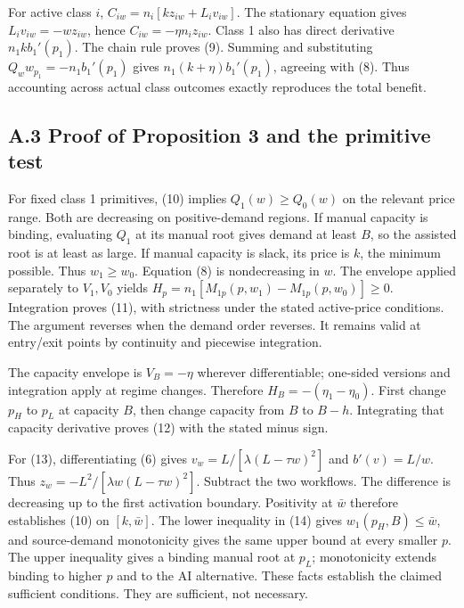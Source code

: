 \documentclass[
  11pt,
  a4paper,
]{article}
\begin{document}
For active class \(i\), \(C_{iw}=n_i[k z_{iw}+L_i v_{iw}]\). The
stationary equation gives \(L_i v_{iw}=-w z_{iw}\), hence
\(C_{iw}=-\eta n_i z_{iw}\). Class 1 also has direct derivative
\(n_1 k b_1'(p_1)\). The chain rule proves (9). Summing and substituting
\(Q_w w_{p_1}=-n_1 b_1'(p_1)\) gives \(n_1(k+\eta)b_1'(p_1)\), agreeing
with (8). Thus accounting across actual class outcomes exactly
reproduces the total benefit.

\hypertarget{a.3-proof-of-proposition-3-and-the-primitive-test}{%
\subsection{A.3 Proof of Proposition 3 and the primitive
test}\label{a.3-proof-of-proposition-3-and-the-primitive-test}}

For fixed class 1 primitives, (10) implies \(Q_1(w)\geq Q_0(w)\) on the
relevant price range. Both are decreasing on positive-demand regions. If
manual capacity is binding, evaluating \(Q_1\) at its manual root gives
demand at least \(B\), so the assisted root is at least as large. If
manual capacity is slack, its price is \(k\), the minimum possible. Thus
\(w_1\geq w_0\). Equation (8) is nondecreasing in \(w\). The envelope
applied separately to \(V_1,V_0\) yields
\(H_p=n_1[M_{1p}(p,w_1)-M_{1p}(p,w_0)]\geq0\). Integration proves (11),
with strictness under the stated active-price conditions. The argument
reverses when the demand order reverses. It remains valid at entry/exit
points by continuity and piecewise integration.

The capacity envelope is \(V_B=-\eta\) wherever differentiable;
one-sided versions and integration apply at regime changes. Therefore
\(H_B=-(\eta_1-\eta_0)\). First change \(p_H\) to \(p_L\) at capacity
\(B\), then change capacity from \(B\) to \(B-h\). Integrating that
capacity derivative proves (12) with the stated minus sign.

For (13), differentiating (6) gives \(v_w=L/[\lambda(L-\tau w)^2]\) and
\(b'(v)=L/w\). Thus \(z_w=-L^2/[\lambda w(L-\tau w)^2]\). Subtract the
two workflows. The difference is decreasing up to the first activation
boundary. Positivity at \(\bar w\) therefore establishes (10) on
\([k,\bar w]\). The lower inequality in (14) gives
\(w_1(p_H,B)\leq\bar w\), and source-demand monotonicity gives the same
upper bound at every smaller \(p\). The upper inequality gives a binding
manual root at \(p_L\); monotonicity extends binding to higher \(p\) and
to the AI alternative. These facts establish the claimed sufficient
conditions. They are sufficient, not necessary.
\end{document}
